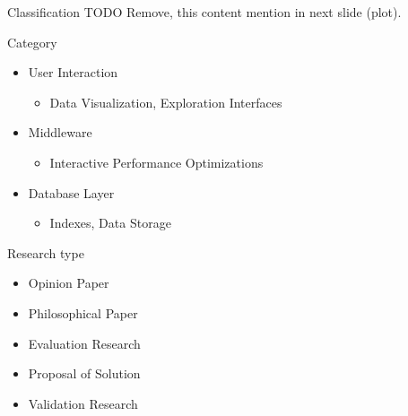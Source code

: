 \documentclass[10pt]{beamer}
\begin{document}
\begin{frame}{Classification}
  TODO Remove, this content mention in next slide (plot).
        \begin{block}{Category}
            \begin{itemize}
                \item User Interaction
                    \begin{itemize}
                        \item Data Visualization, Exploration Interfaces
                    \end{itemize}
                \item Middleware
                    \begin{itemize}
                        \item Interactive Performance Optimizations
                    \end{itemize}
                \item Database Layer
                    \begin{itemize}
                        \item Indexes, Data Storage
                    \end{itemize}
            \end{itemize}
        \end{block}
        \begin{block}{Research type}
            \begin{itemize}
                \item Opinion Paper
                \item Philosophical Paper
                \item Evaluation Research
                \item Proposal of Solution
                \item Validation Research
            \end{itemize}
        \end{block}
\end{frame}
\end{document}
